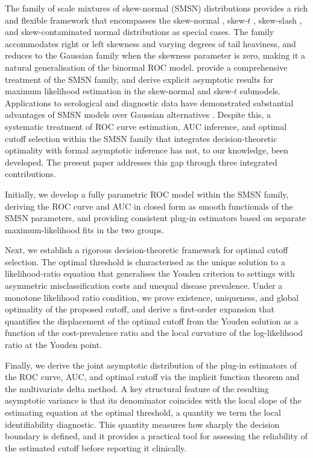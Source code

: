 \documentclass[11pt,a4paper]{article}
\theoremstyle{definition}
\theoremstyle{remark}
\newcommand{\1}{\mathbf{1}}
\begin{document}
The family of scale mixtures of skew-normal (SMSN) distributions
provides a rich and flexible framework that encompasses the skew-normal
\citep{azzalini1985class}, skew-$t$ \citep{azzalini2003distributions},
skew-slash \citep{wang2004skew}, and skew-contaminated normal
distributions as special cases. The family accommodates right or left
skewness and varying degrees of tail heaviness, and reduces to the
Gaussian family when the skewness parameter is zero, making it a
natural generalisation of the binormal ROC model.
\citet{azzalini2014skew} provide a comprehensive treatment of the SMSN
family, and \citet{arevalillo2012maximum} derive explicit asymptotic
results for maximum likelihood estimation in the skew-normal and
skew-$t$ submodels. Applications to serological and diagnostic data
have demonstrated substantial advantages of SMSN models over Gaussian
alternatives \citep{lachos2010likelihood,diasdomingues2024classification,
domingues2024analysis}. Despite this, a systematic treatment of ROC
curve estimation, AUC inference, and optimal cutoff selection within the
SMSN family that integrates decision-theoretic optimality with formal
asymptotic inference has not, to our knowledge, been developed. The
present paper addresses this gap through three integrated contributions.

\smallskip

Initially, we develop a fully parametric ROC
model within the SMSN family, deriving the ROC curve and AUC in closed
form as smooth functionals of the SMSN parameters, and providing
consistent plug-in estimators based on separate maximum-likelihood fits
in the two groups.

\smallskip

Next, we establish a rigorous decision-theoretic framework for optimal cutoff selection. The optimal
threshold is characterised as the unique solution to a likelihood-ratio
equation that generalises the Youden criterion to settings with
asymmetric misclassification costs and unequal disease prevalence.
Under a monotone likelihood ratio condition, we prove existence,
uniqueness, and global optimality of the proposed cutoff, and derive a
first-order expansion that quantifies the displacement of the optimal
cutoff from the Youden solution as a function of the cost-prevalence
ratio and the local curvature of the log-likelihood ratio at the Youden
point.

\smallskip

Finally, we derive the joint asymptotic
distribution of the plug-in estimators of the ROC curve, AUC, and
optimal cutoff via the implicit function theorem and the multivariate
delta method. A key structural feature of the resulting asymptotic
variance is that its denominator coincides with the local slope of the
estimating equation at the optimal threshold, a quantity we term the
local identifiability diagnostic. This quantity measures how
sharply the decision boundary is defined, and it provides a practical
tool for assessing the reliability of the estimated cutoff before
reporting it clinically.
\end{document}
